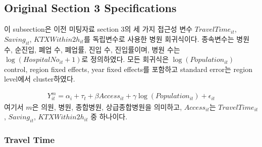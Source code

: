 \documentclass[a4paper, 10pt]{article}
\begin{document}
        \subsection{Original Section 3 Specifications}
            이 subsection은 이전 미팅자료 section 3의 세 가지 접근성 변수
            $TravelTime_{it}$, $Saving_{it}$, $KTXWithin2h_{it}$를 독립변수로 사용한
            병원 회귀식이다. 종속변수는 병원 수, 순진입, 폐업 수, 폐업률, 진입 수, 진입률이며,
            병원 수는 $\log(HospitalNo_{it}+1)$로 정의하였다. 모든 회귀식은
            $\log(Population_{it})$ control, region fixed effects, year fixed effects를
            포함하고 standard error는 region level에서 cluster하였다.

            \begin{align*}
                Y^m_{it}
                =
                \alpha_i + \tau_t
                + \beta Access_{it}
                + \gamma \log(Population_{it})
                + \epsilon_{it}
            \end{align*}
            여기서 $m$은 의원, 병원, 종합병원, 상급종합병원을 의미하고,
            $Access_{it}$는 $TravelTime_{it}$, $Saving_{it}$, $KTXWithin2h_{it}$ 중 하나이다.

            \subsubsection{Travel Time}
                \begin{table}[H]
                    \centering
                    \caption{All-Region Hospital Regression, Travel Time: 의원}
                    
                \end{table}

                \begin{table}[H]
                    \centering
                    \caption{All-Region Hospital Regression, Travel Time: 병원}
                    
                \end{table}

                \begin{table}[H]
                    \centering
                    \caption{All-Region Hospital Regression, Travel Time: 종합병원}
                    
                \end{table}
\end{document}
